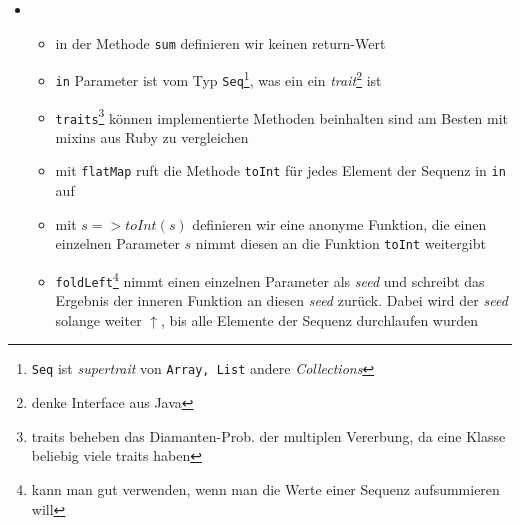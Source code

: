 \begin{itemize}
\begin{itemize}
\begin{itemize}
      $\Rightarrow$ gut wenn man Business-Logik schreibt und diesen Fall
      nicht in jeder Abfrage, sondern einfach am Ergebnistyp der Funktion
      festlegt\footnote{denke an Adminbill aus pictrs}
      \item Parsing des Strings: sollte eben keine zahl eingegeben
      werden, so wird keine Exception geworfen, sondern die Ausgabe
      einfach auf \texttt{None} gemappt
    \end{itemize}
    \item {}
    \begin{itemize}
      \item in der Methode \texttt{sum} definieren wir keinen return-Wert
      \item \texttt{in} Parameter ist vom Typ 
      \texttt{Seq}\footnote{\texttt{Seq} ist \textit{supertrait} von 
      \texttt{Array, List} \und andere \textit{Collections}}, was ein 
      ein \textit{trait}\footnote{denke Interface aus Java} ist
      \item \texttt{traits}\footnote{traits beheben das Diamanten-Prob. 
      der multiplen Vererbung, da eine Klasse beliebig viele traits haben} 
      können implementierte Methoden beinhalten \und sind am Besten mit 
      mixins aus Ruby zu vergleichen
      \item mit \texttt{flatMap} ruft die Methode \texttt{toInt}
      für jedes Element der Sequenz in \texttt{in} auf
      \item mit $s => toInt(s)$ definieren wir eine anonyme
      Funktion, die einen einzelnen Parameter $s$ nimmt \und diesen
      an die Funktion \texttt{toInt} weitergibt
      \item \texttt{foldLeft}\footnote{kann man gut verwenden, wenn man die 
      Werte einer Sequenz aufsummieren will} nimmt einen einzelnen Parameter als
      \textit{seed} \und und schreibt das Ergebnis der inneren
      Funktion an diesen \textit{seed} zurück. Dabei wird der 
      \textit{seed} solange weiter $\uparrow$, bis alle Elemente der 
      Sequenz durchlaufen wurden
    \end{itemize}
  \end{itemize}
\end{itemize}


